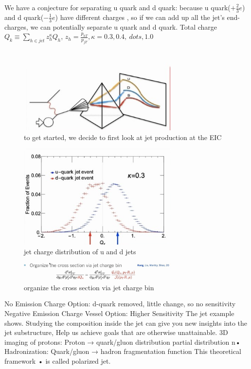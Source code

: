 \documentclass[12pt, a4paper, oneside]{article}
\begin{document}
\begin{spacing}{2.0}
We have a conjecture for separating u quark and d quark: because u quark($+\frac{2}{3}e$) and d quark($-\frac{1}{3}e$) have different charges
, so if we can add up all the jet's end-charges, we can potentially separate u quark and d quark.
Total charge $Q_k \equiv \sum_{h\in jet}z^{\kappa}_hQ_h$, $z_h = \frac{p_{hT}}{p_{jT}},\kappa = 0.3,0.4,\ dots,1.0$
\begin{figure}
    \centering
    \includegraphics[width=8cm]{gamma.jpg}
    \caption{to get started, we decide to first look at jet production at the EIC}
\end{figure}
\begin{figure}
    \centering
    \includegraphics[width=8cm]{xi.jpg}
    \caption{jet charge distribution of u and d jets}
\end{figure}
\begin{figure}
    \centering
    \includegraphics[width=8cm]{omega.jpg}
    \caption{organize the cross section via jet charge bin}
\end{figure}
No Emission Charge Option: d-quark removed, little change, so no sensitivity
Negative Emission Charge Vessel Option: Higher Sensitivity
The jet example shows. Studying the composition inside the jet can give you new insights into the jet substructure,
Help us achieve goals that are otherwise unattainable.
 3D imaging of protons: Proton → quark/gluon distribution partial distribution n• Hadronization:
Quark/gluon → hadron fragmentation function
This theoretical framework • is called polarized jet.




\end{spacing}
\end{document}

